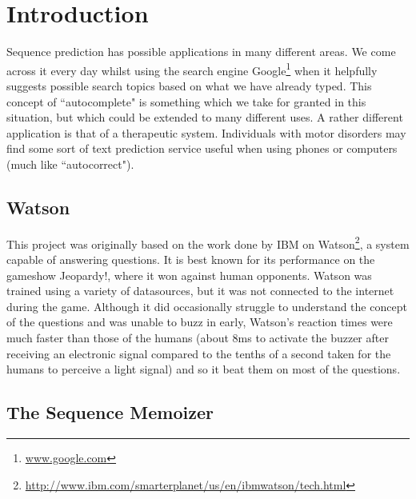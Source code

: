 \chapter{Introduction}


Sequence prediction has possible applications in many different areas. We come across it every day whilst using the search engine Google\footnote{\url{www.google.com}} when it helpfully suggests possible search topics based on what we have already typed. This concept of ``autocomplete" is something which we take for granted in this situation, but which could be extended to many different uses. A rather different application is that of a therapeutic system. Individuals with motor disorders may find some sort of text prediction service useful when using phones or computers (much like ``autocorrect"). 

\section{Watson}

This project was originally based on the work done by IBM on Watson\footnote{\url{http://www.ibm.com/smarterplanet/us/en/ibmwatson/tech.html}}, a system capable of answering questions. It is best known for its performance on the gameshow Jeopardy!, where it won against human opponents. Watson was trained using a variety of datasources, but it was not connected to the internet during the game. Although it did occasionally struggle to understand the concept of the questions and was unable to buzz in early, Watson's reaction times were much faster than those of the humans (about 8ms to activate the buzzer after receiving an electronic signal compared to the tenths of a second taken for the humans to perceive a light signal) and so it beat them on most of the questions.

\section{The Sequence Memoizer}

